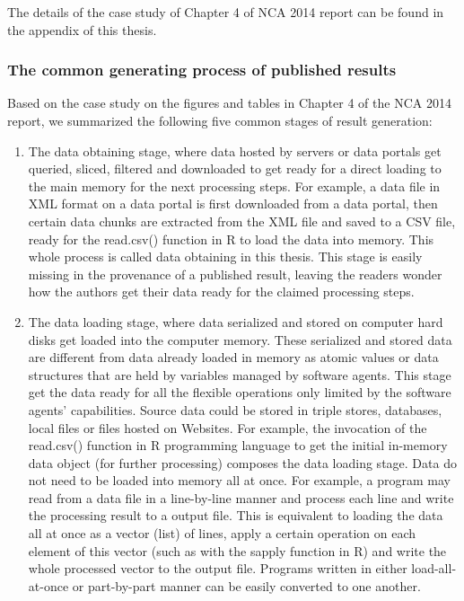 The details of the case study of Chapter 4 of NCA 2014 report can be found in the appendix of this thesis.

\subsubsection{The common generating process of published results}
Based on the case study on the figures and tables in Chapter 4 of the NCA 2014 report, we summarized the following five common stages of result generation:
\begin{enumerate}
	\item The data obtaining stage, where data hosted by servers or data portals get queried, sliced, filtered and downloaded to get ready for a direct loading to the main memory for the next processing steps. For example, a data file in XML format on a data portal is first downloaded from a data portal, then certain data chunks are extracted from the XML file and saved to a CSV file, ready for the read.csv() function in R to load the data into memory. This whole process is called data obtaining in this thesis. This stage is easily missing in the provenance of a published result, leaving the readers wonder how the authors get their data ready for the claimed processing steps.
	\item The data loading stage, where data serialized and stored on computer hard disks get loaded into the computer memory. These serialized and stored data are different from data already loaded in memory as atomic values or data structures that are held by variables managed by software agents. This stage get the data ready for all the flexible operations only limited by the software agents' capabilities. Source data could be stored in triple stores, databases, local files or files hosted on Websites. For example, the invocation of the read.csv() function in R programming language to get the initial in-memory data object (for further processing) composes the data loading stage. Data do not need to be loaded into memory all at once. For example, a program may read from a data file in a line-by-line manner and process each line and write the processing result to a output file. This is equivalent to loading the data all at once as a vector (list) of lines, apply a certain operation on each element of this vector (such as with the sapply function in R) and write the whole processed vector to the output file. Programs written in either load-all-at-once or part-by-part manner can be easily converted to one another.

\end{enumerate}
